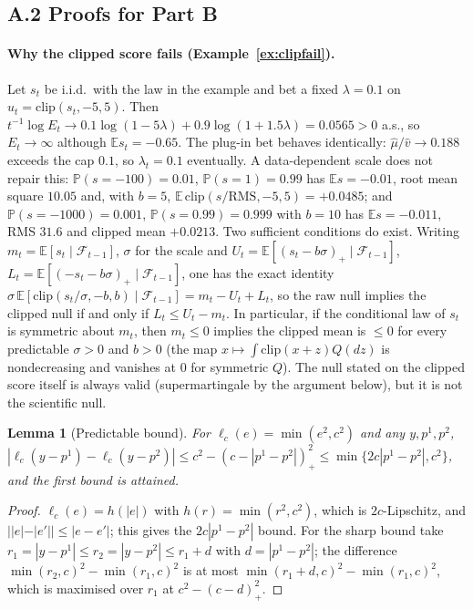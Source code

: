 \documentclass[pdflatex,sn-mathphys-ay]{sn-jnl}%
\theoremstyle{thmstyleone}%
\newtheorem{lemma}[theorem]{Lemma}%
\theoremstyle{thmstyletwo}%
\theoremstyle{thmstylethree}%
\newcommand{\E}{\mathbb{E}}
\newcommand{\Prob}{\mathbb{P}}
\newcommand{\F}{\mathcal{F}}
\newcommand{\clip}{\mathrm{clip}}
\begin{document}
\begin{appendices}
\subsection*{A.2 Proofs for Part B}

\paragraph{Why the clipped score fails (Example~\ref{ex:clipfail}).} Let $s_t$ be i.i.d.\ with the law in the
example and bet a fixed $\lambda=0.1$ on $u_t=\clip(s_t,-5,5)$. Then
$t^{-1}\log E_t\to0.1\log(1-5\lambda)+0.9\log(1+1.5\lambda)=0.0565>0$ a.s., so $E_t\to\infty$ although
$\E s_t=-0.65$. The plug-in bet behaves identically: $\hat\mu/\hat v\to0.188$ exceeds the cap $0.1$, so $\lambda_t=0.1$
eventually. A data-dependent scale does not repair this: $\Prob(s=-100)=0.01$, $\Prob(s=1)=0.99$ has $\E s=-0.01$, root
mean square $10.05$ and, with $b=5$, $\E\,\clip(s/\mathrm{RMS},-5,5)=+0.0485$; and
$\Prob(s=-1000)=0.001$, $\Prob(s=0.99)=0.999$ with $b=10$ has $\E s=-0.011$, RMS $31.6$ and clipped mean $+0.0213$.
Two sufficient conditions do exist. Writing $m_t=\E[s_t\mid\F_{t-1}]$, $\sigma$ for the scale and
$U_t=\E[(s_t-b\sigma)_+\mid\F_{t-1}]$, $L_t=\E[(-s_t-b\sigma)_+\mid\F_{t-1}]$, one has the exact identity
$\sigma\,\E[\clip(s_t/\sigma,-b,b)\mid\F_{t-1}]=m_t-U_t+L_t$, so the raw null implies the clipped null if and
only if $L_t\le U_t-m_t$. In particular, if the conditional law of $s_t$ is symmetric about $m_t$, then $m_t\le0$ implies
the clipped mean is $\le0$ for every predictable $\sigma>0$ and $b>0$ (the map $x\mapsto\int\clip(x+z)Q(dz)$ is nondecreasing and
vanishes at $0$ for symmetric $Q$). The null stated on the clipped score itself is always valid
(supermartingale by the argument below), but it is not the scientific null.

\begin{lemma}[Predictable bound]\label{lem:bound}
For $\ell_c(e)=\min(e^2,c^2)$ and any $y,p^1,p^2$,
$|\ell_c(y-p^1)-\ell_c(y-p^2)|\le c^2-(c-|p^1-p^2|)_+^2\le\min\{2c|p^1-p^2|,c^2\}$, and the first bound is attained.
\end{lemma}
\begin{proof}
$\ell_c(e)=h(|e|)$ with $h(r)=\min(r^2,c^2)$, which is $2c$-Lipschitz, and $||e|-|e'||\le|e-e'|$; this gives the
$2c|p^1-p^2|$ bound. For the sharp bound take $r_1=|y-p^1|\le r_2=|y-p^2|\le r_1+d$ with $d=|p^1-p^2|$; the difference
$\min(r_2,c)^2-\min(r_1,c)^2$ is at most $\min(r_1+d,c)^2-\min(r_1,c)^2$, which is maximised over $r_1$
at $c^2-(c-d)_+^2$.
\end{proof}


\end{appendices}
\end{document}
